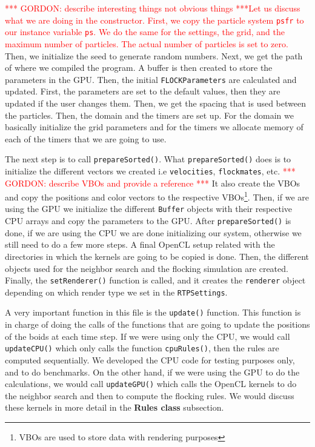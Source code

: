 \textcolor{red}{*** GORDON: describe interesting things not obvious things ***Let us discuss what we are doing in the constructor. First, we copy the particle system \texttt{psfr} to our instance variable \texttt{ps}. We do the same for the settings, the grid, and the maximum number of particles. The actual number of particles is set to zero.} Then, we initialize the seed to generate random numbers. Next, we get the path of where we compiled the program. A buffer is then created to store the parameters in the GPU. Then, the initial \texttt{FLOCKParameters} are calculated and updated. First, the parameters are set to the default values, then they are updated if the user changes them. Then, we get the spacing that is used between the particles. Then, the domain and the timers are set up. For the domain we basically initialize the grid parameters and for the timers we allocate memory of each of the timers that we are going to use.

The next step is to call \texttt{prepareSorted()}. What \texttt{prepareSorted()} does is to initialize the different vectors we created i.e \texttt{velocities}, \texttt{flockmates}, etc. \textcolor{red}{*** GORDON: describe VBOs and provide a reference ***} It also create the VBOs and copy the positions and color vectors to the respective VBOs\footnote{VBOs are used to store data with rendering purposes}. Then, if we are using the GPU we initialize the different \texttt{Buffer} objects with their respective CPU arrays and copy the parameters to the GPU. After \texttt{prepareSorted()} is done, if we are using the CPU we are done initializing our system, otherwise we still need to do a few more steps. A final OpenCL setup related with the directories in which the kernels are going to be copied is done. Then, the different objects used for the neighbor search and the flocking simulation are created. Finally, the \texttt{setRenderer()} function is called, and it creates the \texttt{renderer} object depending on which render type we set in the \texttt{RTPSettings}.

A very important function in this file is the \texttt{update()} function. This function is in charge of doing the calls of the functions that are going to update the positions of the boids at each time step. If we were using only the CPU, we would call \texttt{updateCPU()} which only calls the function \texttt{cpuRules()}, then the rules are computed sequentially. We developed the CPU code for testing purposes only, and to do benchmarks. On the other hand, if we were using the GPU to do the calculations, we would call \texttt{updateGPU()} which calls the OpenCL kernels to do the neighbor search and then to compute the flocking rules. We would discuss these kernels in more detail in the \textbf{Rules class} subsection.

